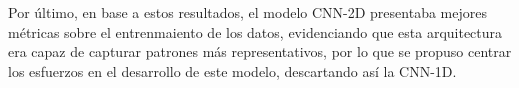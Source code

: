 \documentclass{uathesis-es}
\begin{document}
{Por último, en base a estos resultados, el modelo CNN-2D presentaba mejores métricas sobre el entrenmaiento de los datos, evidenciando que esta arquitectura era capaz de capturar patrones más representativos, por lo que se propuso centrar los esfuerzos en el desarrollo de este modelo, descartando así la CNN-1D. 


}
\end{document}

